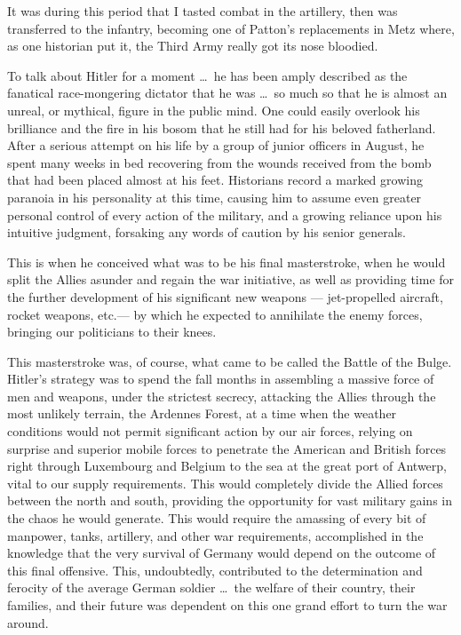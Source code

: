 \documentclass[../m3y]{subfiles}
\begin{document}
It was during this period that I tasted combat in the artillery, then was transferred to the infantry, becoming one of Patton's replacements in Metz where, as one historian put it, the Third Army really got its nose bloodied.

To talk about Hitler for a moment \ldots\ he has been amply described as the fanatical race-mongering dictator that he was \ldots\ so much so that he is almost an unreal, or mythical, figure in the public mind. One could easily overlook his brilliance and the fire in his bosom that he still had for his beloved fatherland. After a serious attempt on his life by a group of junior officers in August, he spent many weeks in bed recovering from the wounds received from the bomb that had been placed almost at his feet. Historians record a marked growing paranoia in his personality at this time, causing him to assume even greater personal control of every action of the military, and a growing reliance upon his intuitive judgment, forsaking any words of caution by his senior generals.

This is when he conceived what was to be his final masterstroke, when he would split the Allies asunder and regain the war initiative, as well as providing time for the further development of his significant new weapons --- jet-propelled aircraft, rocket weapons, etc.\@ --- by which he expected to annihilate the enemy forces, bringing our politicians to their knees.

This masterstroke was, of course, what came to be called the Battle of the Bulge. Hitler's strategy was to spend the fall months in assembling a massive force of men and weapons, under the strictest secrecy, attacking the Allies through the most unlikely terrain, the Ardennes Forest, at a time when the weather conditions would not permit significant action by our air forces, relying on surprise and superior mobile forces to penetrate the American and British forces right through Luxembourg and Belgium to the sea at the great port of Antwerp, vital to our supply requirements. This would completely divide the Allied forces between the north and south, providing the opportunity for vast military gains in the chaos he would generate. This would require the amassing of every bit of manpower, tanks, artillery, and other war requirements, accomplished in the knowledge that the very survival of Germany would depend on the outcome of this final offensive. This, undoubtedly, contributed to the determination and ferocity of the average German soldier \ldots\ the welfare of their country, their families, and their future was dependent on this one grand effort to turn the war around.
\end{document}
